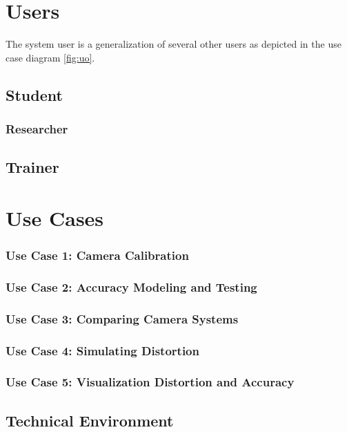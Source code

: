 \documentclass[11pt]{report}
\begin{document}
\section{Users} 

The system user is a generalization of several other users as depicted in the use case diagram \ref{fig:uo}. 

\subsection{Student}

\subsubsection{Researcher}

\subsection{Trainer}

\section{Use Cases}

\subsubsection{Use Case 1: Camera Calibration}

\subsubsection{Use Case 2: Accuracy Modeling and Testing} 

\subsubsection{Use Case 3: Comparing Camera Systems} 

\subsubsection{Use Case 4: Simulating Distortion } 

\subsubsection{Use Case 5: Visualization Distortion and Accuracy}
 
 
\subsection{Technical Environment}
\end{document}
